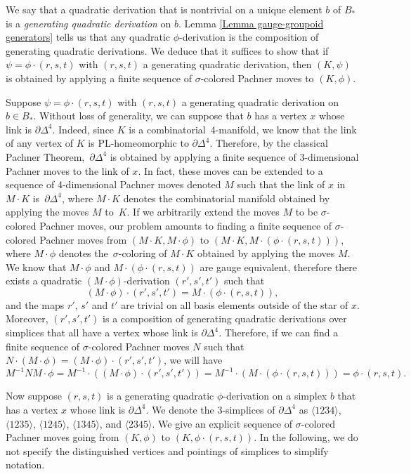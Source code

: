 \documentclass[a4paper, oneside]{amsart}
\numberwithin{equation}{subsection}
\theoremstyle{referencedlemma}
\theoremstyle{plain} %
\theoremstyle{remark}
\begin{document}
We say that a quadratic derivation that is nontrivial on a unique element $b$ of $B_*$ is a \emph{generating quadratic derivation} on $b$.  Lemma \ref{Lemma gauge-groupoid generators} tells us that any quadratic $\phi$-derivation is the composition of generating quadratic derivations. We deduce that it suffices to show that if $\psi = \phi\cdot (r,s,t)$ with $(r,s,t)$ a generating quadratic derivation, then $(K,\psi)$ is obtained by applying a finite sequence of $\sigma$-colored Pachner moves to $(K,\phi)$. 

Suppose $\psi = \phi\cdot (r,s,t)$ with $(r,s,t)$ a generating quadratic derivation on $b\in B_*$. Without loss of generality, we can suppose that $b$ has a vertex $x$ whose link is $\partial \Delta^4$.  Indeed,  since $K$ is a combinatorial~4-manifold, we know that the link of any vertex of $K$ is PL-homeomorphic to $\partial \Delta^4$.  Therefore, by the classical Pachner Theorem,~$\partial \Delta^4$ is obtained by applying a finite sequence of 3-dimensional Pachner moves to the link of $x$.  In fact, these moves can be extended to a sequence of 4-dimensional Pachner moves denoted $M$ such that the link of $x$ in~$M\cdot K$ is~$\partial \Delta^4$, where $M\cdot K$ denotes the combinatorial manifold obtained by applying the moves $M$ to~$K$.  If we arbitrarily extend the moves $M$ to be $\sigma$-colored Pachner moves, our problem amounts to finding a finite sequence of $\sigma$-colored Pachner moves from $(M\cdot K, M\cdot \phi)$ to $(M\cdot K, M\cdot (\phi \cdot (r,s,t)))$, where $M\cdot \phi$ denotes the~$\sigma$-coloring of $M\cdot K$ obtained by applying the moves $M$.  We know that $M\cdot \phi$ and $M\cdot (\phi\cdot (r,s,t))$ are gauge equivalent, therefore there exists a quadratic $(M\cdot \phi )$-derivation $(r',s',t')$ such that 
$$
(M\cdot \phi)\cdot (r',s',t') = M\cdot (\phi \cdot (r,s,t)),
$$
and the maps $r'$, $s'$ and $t'$ are trivial on all basis elements outside of the star of $x$.  Moreover, $(r',s',t')$ is a composition of generating quadratic derivations over simplices that all have a vertex whose link is $\partial \Delta^4$.  Therefore, if we can find a finite sequence of $\sigma$-colored Pachner moves $N$ such that $N\cdot (M\cdot \phi) = (M\cdot \phi) \cdot (r',s',t')$, we will have
$$
M^{-1}NM\cdot \phi = M^{-1}\cdot ((M\cdot \phi) \cdot (r',s',t')) = M^{-1}\cdot (M\cdot (\phi \cdot (r,s,t))) = \phi \cdot (r,s,t).
$$

Now suppose $(r,s,t)$ is a generating quadratic $\phi$-derivation on a simplex $b$ that has a vertex $x$ whose link is $\partial \Delta^4$. We denote the 3-simplices of $\partial \Delta^4$ as $\langle 1234\rangle$, $\langle 1235\rangle$, $\langle 1245\rangle$, $\langle 1345\rangle$, and $\langle 2345\rangle$.  We give an explicit sequence of $\sigma$-colored Pachner moves going from $(K,\phi)$ to $(K,\phi\cdot (r,s,t))$. In the following, we do not specify the distinguished vertices and pointings of simplices to simplify notation.
\end{document}
